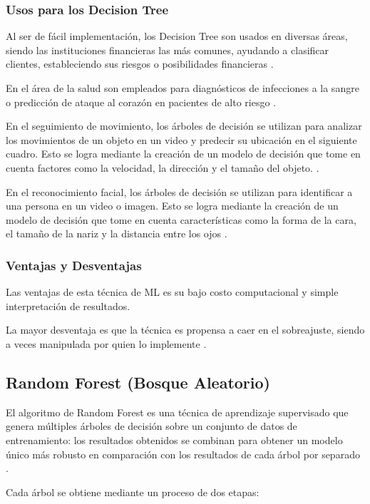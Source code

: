 \subsubsection{Usos para los Decision Tree}
Al ser de fácil implementación, los Decision Tree son usados en diversas áreas, siendo las instituciones financieras las más comunes, ayudando a clasificar clientes, estableciendo sus riesgos o posibilidades financieras \cite{Harrington2012}.\\
\par En el área de la salud son empleados para diagnósticos de infecciones a la sangre o predicción de ataque al corazón en pacientes de alto riesgo \cite{Harrington2012}.\\
\par En el seguimiento de movimiento, los árboles de decisión se utilizan para analizar los movimientos de un objeto en un video y predecir su ubicación en el siguiente cuadro. Esto se logra mediante la creación de un modelo de decisión que tome en cuenta factores como la velocidad, la dirección y el tamaño del objeto. \cite{Harrington2012}.\\
\par En el reconocimiento facial, los árboles de decisión se utilizan para identificar a una persona en un video o imagen. Esto se logra mediante la creación de un modelo de decisión que tome en cuenta características como la forma de la cara, el tamaño de la nariz y la distancia entre los ojos \cite{Harrington2012}.\\

\doublespacing
\subsubsection{Ventajas y Desventajas}
Las ventajas de esta técnica de ML es su bajo costo computacional y simple interpretación de resultados. \\
\par La mayor desventaja es que la técnica es propensa a caer en el sobreajuste, siendo a veces manipulada por quien lo implemente \cite{Harrington2012}.\\

\doublespacing
\subsection{Random Forest (Bosque Aleatorio)}
\label{sec:RF}
El algoritmo de Random Forest es una técnica de aprendizaje supervisado que genera múltiples árboles de decisión sobre un conjunto de datos de entrenamiento: los resultados obtenidos se combinan para obtener un modelo único más robusto en comparación con los resultados de cada árbol por separado \cite{breiman2001random}.\\
\par Cada árbol se obtiene mediante un proceso de dos etapas:

